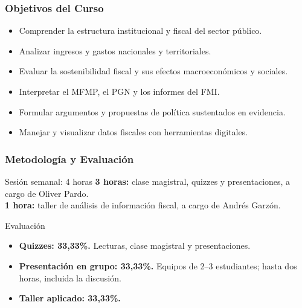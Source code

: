\begin{frame}
  \frametitle{Objetivos del Curso}
  \begin{itemize}
    \item Comprender la estructura institucional y fiscal del sector p\'ublico.
    \item Analizar ingresos y gastos nacionales y territoriales.
    \item Evaluar la sostenibilidad fiscal y sus efectos macroecon\'omicos y sociales.
    \item Interpretar el MFMP, el PGN y los informes del FMI.
    \item Formular argumentos y propuestas de pol\'itica sustentados en evidencia.
    \item Manejar y visualizar datos fiscales con herramientas digitales.
  \end{itemize}
\end{frame}

\begin{frame}
  \frametitle{Metodolog\'ia y Evaluaci\'on}
  \begin{block}{Sesi\'on semanal: 4 horas}
    \textbf{3 horas:} clase magistral, quizzes y presentaciones, a cargo de Oliver Pardo.\\
    \textbf{1 hora:} taller de an\'alisis de informaci\'on fiscal, a cargo de Andr\'es Garz\'on.
  \end{block}
  \begin{alertblock}{Evaluaci\'on}
    \begin{itemize}
      \item \textbf{Quizzes: 33,33\%.} Lecturas, clase magistral y presentaciones.
      \item \textbf{Presentaci\'on en grupo: 33,33\%.} Equipos de 2--3 estudiantes; hasta dos horas, incluida la discusi\'on.
      \item \textbf{Taller aplicado: 33,33\%.}
    \end{itemize}
  \end{alertblock}
\end{frame}


